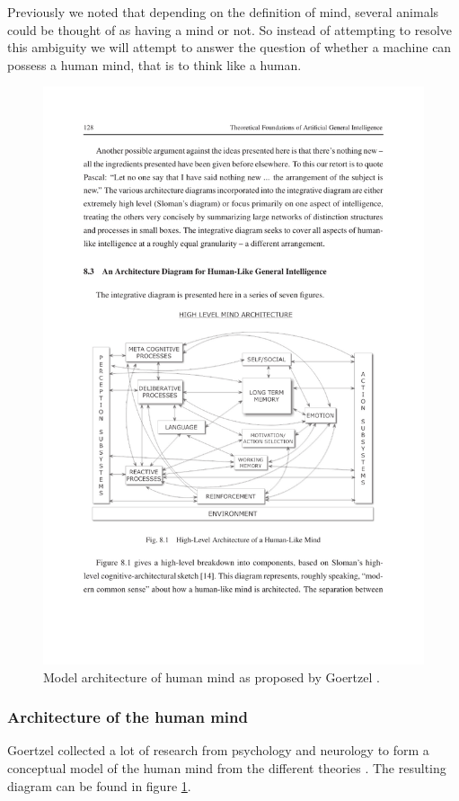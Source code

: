 \documentclass[11pt]{article}
\begin{document}
Previously we noted that depending on the definition of mind, several animals could be thought of as having a mind or not. So instead of attempting to resolve this ambiguity we will attempt 
to answer the question of whether a machine can possess a human mind, that is to think like a human.

\begin{figure}
\centering
\includegraphics[scale=1.0]{mindStructure.pdf}
\caption{Model architecture of human mind as proposed by Goertzel \cite{goertzel2012agi}.}
\label{fig:mindArchi}
\end{figure}

\subsubsection*{Architecture of the human mind}
Goertzel collected a lot of research from psychology and neurology to form a conceptual model of the human mind from the different theories \cite{goertzel2012agi}. The resulting diagram can be found in figure \ref{fig:mindArchi}. 
\end{document}

